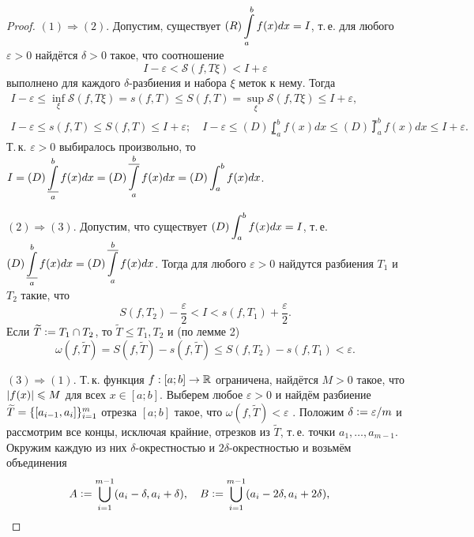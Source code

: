 \begin{proof}
    $(1) \Rightarrow (2)$. Допустим, существует $\displaystyle (R)\int\limits_a^bf(x)dx = I$, т.\,е. для любого $\varepsilon > 0$ найдётся $\delta > 0$ такое, что соотношение
    \[
        I - \varepsilon < \mathcal{S}(f, T\xi) < I + \varepsilon
    \]
    выполнено для каждого $\delta$-разбиения и набора $\xi$ меток к нему. Тогда
    \begin{gather*}
        I - \varepsilon \leqslant \inf\limits_\xi\mathcal{S}(f, T\xi) = s(f, T) \leqslant S(f, T) = \sup\limits_\xi\mathcal{S}(f, T\xi) \leqslant I + \varepsilon,\\
        I - \varepsilon \leqslant s(f, T) \leqslant S(f, T) \leqslant I + \varepsilon;\quad
        I - \varepsilon \leqslant (D)\lowint_a^bf(x)dx \leqslant (D)\upint_a^bf(x)dx \leqslant I + \varepsilon.
    \end{gather*}
    Т.\,к. $\varepsilon > 0$ выбиралось произвольно, то $\displaystyle I = (D)\operatorname*{\underline{\int}}_a^bf(x)dx = (D)\operatorname*{\overline{\int}}_a^bf(x)dx = (D)\int_a^bf(x)dx$.

    $(2) \Rightarrow (3)$. Допустим, что существует $\displaystyle (D)\int_a^bf(x)dx = I$, т.\,е. $\displaystyle (D)\operatorname*{\underline{\int}}_a^bf(x)dx = (D)\operatorname*{\overline{\int}}_a^bf(x)dx$. Тогда для любого $\varepsilon > 0$ найдутся разбиения $T_1$ и $T_2$ такие, что
    \[
        S(f, T_2) - \frac{\varepsilon}{2} < I < s(f, T_1) + \frac{\varepsilon}{2}.
    \]
    Если $\widetilde{T} \vcentcolon = T_1 \cap T_2$, то $\widetilde{T} \leqslant T_1, T_2$ и (по лемме 2)
    \[
        \omega(f, \widetilde{T}) = S(f, \widetilde{T}) - s(f, \widetilde{T}) \leqslant S(f, T_2) - s(f, T_1) < \varepsilon.
    \]

    $(3) \Rightarrow (1)$. Т.\,к. функция $f: [a; b] \to \mathbb{R}$ ограничена, найдётся $M > 0$ такое, что $\left\lvert f(x)\right\rvert \leqslant M$ для всех $x \in [a; b]$. Выберем любое $\varepsilon > 0$ и найдём разбиение $\widetilde{T} = \{\left[a_{i - 1}, a_i\right]\}_{i = 1}^m$ отрезка $[a; b]$ такое, что $\omega(f, \widetilde{T}) < \varepsilon$ . Положим $\delta \vcentcolon = \varepsilon / m$ и рассмотрим все концы, исключая крайние, отрезков из $\widetilde{T}$, т.\,е. точки $a_1, \ldots, a_{m - 1}$. Окружим каждую из них $\delta$-окрестностью и $2\delta$-окрестностью и возьмём объединения
    \[
        A \vcentcolon = \bigcup_{i = 1}^{m - 1}(a_i - \delta, a_i + \delta),\quad
        B \vcentcolon = \bigcup_{i = 1}^{m - 1}(a_i - 2\delta, a_i + 2\delta),\quad
    \]


\end{proof}
